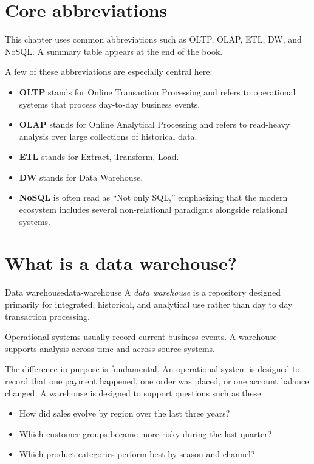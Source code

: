 \documentclass[11pt,a4paper,openany]{book}
\begin{document}
\section{Core abbreviations}
This chapter uses common abbreviations such as OLTP, OLAP, ETL, DW, and NoSQL. A summary table appears at the end of the book.

A few of these abbreviations are especially central here:
\begin{itemize}
\item \textbf{OLTP} stands for Online Transaction Processing and refers to operational systems that process day-to-day business events.
\item \textbf{OLAP} stands for Online Analytical Processing and refers to read-heavy analysis over large collections of historical data.
\item \textbf{ETL} stands for Extract, Transform, Load.
\item \textbf{DW} stands for Data Warehouse.
\item \textbf{NoSQL} is often read as ``Not only SQL,'' emphasizing that the modern ecosystem includes several non-relational paradigms alongside relational systems.
\end{itemize}

\section{What is a data warehouse?}
\begin{definition}{Data warehouse}{data-warehouse}
A \emph{data warehouse} is a repository designed primarily for integrated, historical, and analytical use rather than day to day transaction processing.
\end{definition}

Operational systems usually record current business events. A warehouse supports analysis across time and across source systems.

The difference in purpose is fundamental. An operational system is designed to record that one payment happened, one order was placed, or one account balance changed. A warehouse is designed to support questions such as these:
\begin{itemize}
\item How did sales evolve by region over the last three years?
\item Which customer groups became more risky during the last quarter?
\item Which product categories perform best by season and channel?
\end{itemize}
\end{document}

